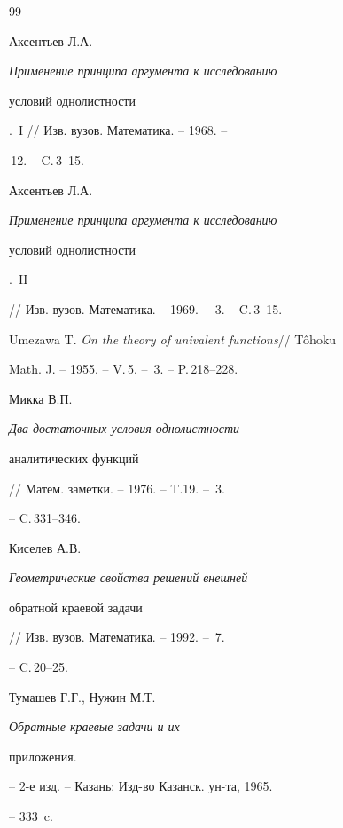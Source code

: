 \begin{thebibliography}{99}


Аксентьев Л.А. {\it Применение принципа аргумента к исследованию


условий однолистности}.~I // Изв. вузов. Математика. -- 1968. --


\No\,12. -- C.\,3--15.




Аксентьев Л.А. {\it Применение принципа аргумента к исследованию


условий однолистности}.~II


// Изв. вузов. Математика. --  1969. -- \No\,3. -- C.\,3--15.




Umezawa T. {\it On the theory of univalent functions}// T\^ohoku


Math. J. -- 1955. -- V.\,5. -- \No\,3. -- P.\,218--228.




Микка В.П. {\it Два достаточных условия однолистности


аналитических функций} // Матем. заметки. -- 1976. -- T.19. -- \No\,3.


-- C.\,331--346.




Киселев А.В. {\it Геометрические свойства решений внешней


обратной краевой задачи} // Изв. вузов. Математика. -- 1992. -- \No\,7.


-- C.\,20--25.




Тумашев Г.Г., Нужин М.Т. {\it Обратные краевые задачи и их


приложения.} -- 2-е изд. -- Казань: Изд-во Казанск. ун-та, 1965.


-- 333~c.





\end{thebibliography}





\vskip 2cm














\label{end}





